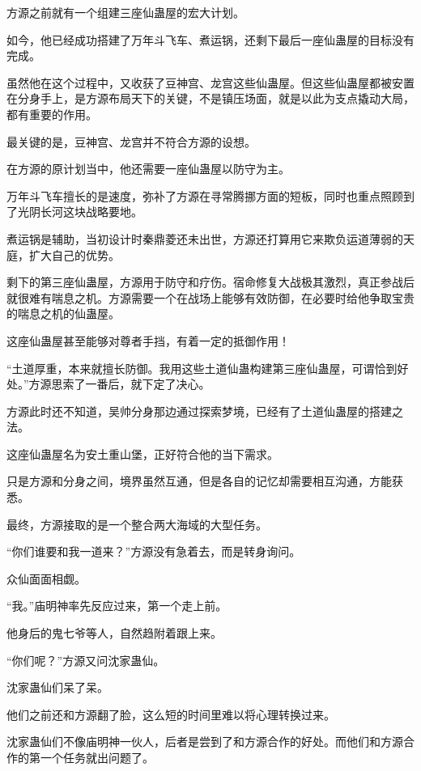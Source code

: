 
\begin{this_body}

方源之前就有一个组建三座仙蛊屋的宏大计划。

如今，他已经成功搭建了万年斗飞车、煮运锅，还剩下最后一座仙蛊屋的目标没有完成。

虽然他在这个过程中，又收获了豆神宫、龙宫这些仙蛊屋。但这些仙蛊屋都被安置在分身手上，是方源布局天下的关键，不是镇压场面，就是以此为支点撬动大局，都有重要的作用。

最关键的是，豆神宫、龙宫并不符合方源的设想。

在方源的原计划当中，他还需要一座仙蛊屋以防守为主。

万年斗飞车擅长的是速度，弥补了方源在寻常腾挪方面的短板，同时也重点照顾到了光阴长河这块战略要地。

煮运锅是辅助，当初设计时秦鼎菱还未出世，方源还打算用它来欺负运道薄弱的天庭，扩大自己的优势。

剩下的第三座仙蛊屋，方源用于防守和疗伤。宿命修复大战极其激烈，真正参战后就很难有喘息之机。方源需要一个在战场上能够有效防御，在必要时给他争取宝贵的喘息之机的仙蛊屋。

这座仙蛊屋甚至能够对尊者手挡，有着一定的抵御作用！

“土道厚重，本来就擅长防御。我用这些土道仙蛊构建第三座仙蛊屋，可谓恰到好处。”方源思索了一番后，就下定了决心。

方源此时还不知道，吴帅分身那边通过探索梦境，已经有了土道仙蛊屋的搭建之法。

这座仙蛊屋名为安土重山堡，正好符合他的当下需求。

只是方源和分身之间，境界虽然互通，但是各自的记忆却需要相互沟通，方能获悉。

最终，方源接取的是一个整合两大海域的大型任务。

“你们谁要和我一道来？”方源没有急着去，而是转身询问。

众仙面面相觑。

“我。”庙明神率先反应过来，第一个走上前。

他身后的鬼七爷等人，自然趋附着跟上来。

“你们呢？”方源又问沈家蛊仙。

沈家蛊仙们呆了呆。

他们之前还和方源翻了脸，这么短的时间里难以将心理转换过来。

沈家蛊仙们不像庙明神一伙人，后者是尝到了和方源合作的好处。而他们和方源合作的第一个任务就出问题了。


\end{this_body}
